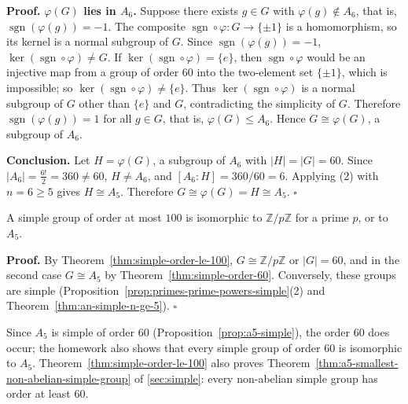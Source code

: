 \documentclass[11pt]{report}
\renewenvironment{proof}[1][Proof]{\noindent\textbf{#1.} }{\hfill$\square$\par\vspace{5pt}}
\begin{document}
\begin{proof}
\textbf{$\varphi(G)$ lies in $A_6$.} Suppose there exists $g \in G$ with $\varphi(g) \notin A_6$, that is, $\operatorname{sgn}(\varphi(g)) = -1$. The composite $\operatorname{sgn} \circ \varphi \colon G \to \{\pm 1\}$ is a homomorphism, so its kernel is a normal subgroup of $G$. Since $\operatorname{sgn}(\varphi(g)) = -1$, $\ker(\operatorname{sgn} \circ \varphi) \neq G$. If $\ker(\operatorname{sgn} \circ \varphi) = \{e\}$, then $\operatorname{sgn} \circ \varphi$ would be an injective map from a group of order $60$ into the two-element set $\{\pm 1\}$, which is impossible; so $\ker(\operatorname{sgn} \circ \varphi) \neq \{e\}$. Thus $\ker(\operatorname{sgn} \circ \varphi)$ is a normal subgroup of $G$ other than $\{e\}$ and $G$, contradicting the simplicity of $G$. Therefore $\operatorname{sgn}(\varphi(g)) = 1$ for all $g \in G$, that is, $\varphi(G) \leq A_6$. Hence $G \cong \varphi(G)$, a subgroup of $A_6$.

\textbf{Conclusion.} Let $H = \varphi(G)$, a subgroup of $A_6$ with $|H| = |G| = 60$. Since $|A_6| = \frac{6!}{2} = 360 \neq 60$, $H \neq A_6$, and $[A_6 : H] = 360/60 = 6$. Applying (2) with $n = 6 \geq 5$ gives $H \cong A_5$. Therefore $G \cong \varphi(G) = H \cong A_5$.
\end{proof}

\begin{corbox}\label{cor:simple-le-100-a5}
A simple group of order at most $100$ is isomorphic to $\mathbb{Z}/p\mathbb{Z}$ for a prime $p$, or to $A_5$.
\end{corbox}

\begin{proof}
By Theorem~\ref{thm:simple-order-le-100}, $G \cong \mathbb{Z}/p\mathbb{Z}$ or $|G| = 60$, and in the second case $G \cong A_5$ by Theorem~\ref{thm:simple-order-60}. Conversely, these groups are simple (Proposition~\ref{prop:primes-prime-powers-simple}(2) and Theorem~\ref{thm:an-simple-n-ge-5}).
\end{proof}


Since $A_5$ is simple of order $60$ (Proposition~\ref{prop:a5-simple}), the order $60$ does occur; the homework also shows that every simple group of order $60$ is isomorphic to $A_5$. Theorem~\ref{thm:simple-order-le-100} also proves Theorem~\ref{thm:a5-smallest-non-abelian-simple-group} of \ref{sec:simple}: every non-abelian simple group has order at least $60$.
\end{document}
